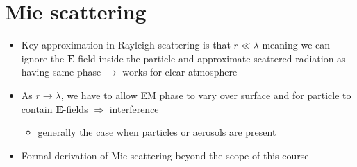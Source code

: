 \documentclass[11pt, oneside]{article}
\begin{document}
\section{Mie scattering}
\label{s:mie}

\begin{itemize}
	\item Key approximation in Rayleigh scattering is that $r \ll \lambda$ meaning we can ignore the $\mathbf{E}$ field inside the particle and approximate scattered radiation as having same phase $\rightarrow$ works for clear atmosphere
	\item As $r \rightarrow \lambda$, we have to allow EM phase to vary over surface and for particle to contain $\mathbf{E}$-fields $\Rightarrow$ interference
	\begin{itemize}
		\item[$\rightarrow$] generally the case when particles or aerosols are present
	\end{itemize}
	\item Formal derivation of Mie scattering beyond the scope of this course

\end{itemize}
\end{document}
